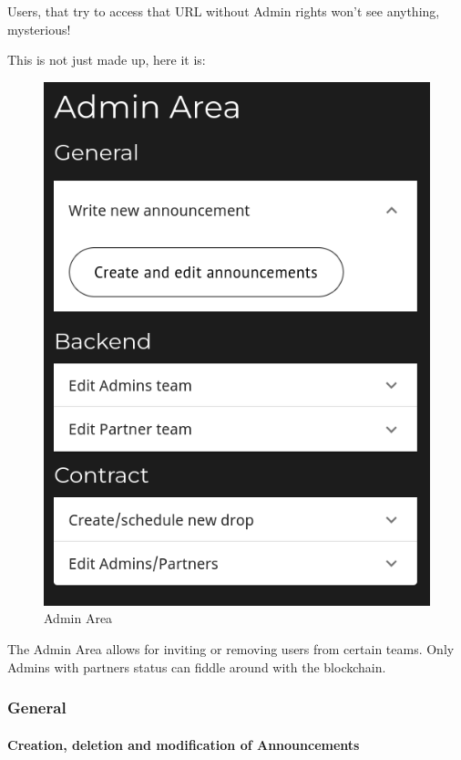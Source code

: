 \documentclass[
]{article}
\begin{document}
Users, that try to access that URL without Admin rights won't see
anything, mysterious!

This is not just made up, here it is:

\begin{figure}
\centering
\includegraphics{images/admin_area.png}
\caption{Admin Area}
\end{figure}\newpage

The Admin Area allows for inviting or removing users from certain teams.
Only Admins with partners status can fiddle around with the blockchain.

\hypertarget{general}{%
\subsubsection{General}\label{general}}

\hypertarget{creation-deletion-and-modification-of-announcements}{%
\paragraph{Creation, deletion and modification of
Announcements}\label{creation-deletion-and-modification-of-announcements}}
\end{document}
